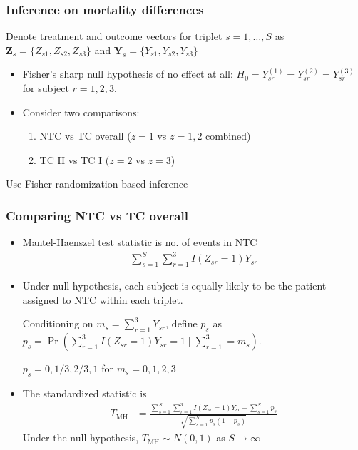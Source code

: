 
\begin{frame}
  \frametitle{Inference on mortality differences}
  
  Denote treatment and outcome vectors for triplet $s=1,\ldots,S$ as
  $\mathbf{Z}_s = \{Z_{s1}, Z_{s2}, Z_{s3}\}$ and
  $\mathbf{Y}_s = \{Y_{s1}, Y_{s2}, Y_{s3}\}$

  \medskip 

  \begin{itemize}
  \item Fisher's sharp null hypothesis of no effect at all:
    $H_0 = Y^{(1)}_{sr} = Y^{(2)}_{sr} = Y^{(3)}_{sr}$ for subject
    $r=1,2,3$. \medskip 
  \item Consider two comparisons: \smallskip
    \begin{enumerate}[(1)]
    \item NTC vs TC overall ($z=1$ vs $z=1,2$ combined) \medskip
    \item TC II vs TC I ($z=2$ vs $z=3$)
    \end{enumerate}
  \end{itemize}

  \medskip  

  Use Fisher randomization based inference

\end{frame}


\begin{frame}
  \frametitle{Comparing NTC vs TC overall}
  
  \begin{itemize}
  \item Mantel-Haenszel test statistic is no. of events in NTC
    \begin{align*}
      \sum_{s=1}^{S} \sum_{r=1}^{3} I(Z_{sr} = 1) Y_{sr}
    \end{align*} 
  \item Under null hypothesis, each subject is equally likely to be
    the patient assigned to NTC within each triplet.

    Conditioning on $m_s = \sum_{r=1}^{3} Y_{sr}$, define $p_s$ as
    $p_s = \Pr(\sum_{r=1}^{3}I(Z_{sr} = 1)Y_{sr} = 1 \mid \sum_{r=1}^{3}
    = m_s) $.

    $p_s = 0, 1/3, 2/3, 1$ for $m_s = 0,1,2,3$
  \item The standardized statistic is
    \begin{align*}
      T_{\text{MH}} &= \frac{\sum_{s=1}^{S} \sum_{r=1}^{3} I(Z_{sr} = 1)
               Y_{sr} - \sum_{s=1}^{S} p_s}{\sqrt{\sum_{s=1}^{S}p_s(1-p_s)}}
    \end{align*}
    Under the null hypothesis, $T_{\text{MH}} \sim N(0, 1)$ as
    $S\rightarrow \infty$
  \end{itemize}
  
\end{frame}

